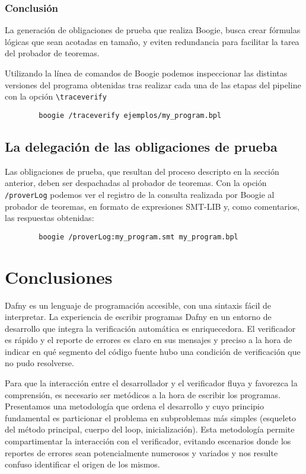 \documentclass[12pt, a4paper, openany, fleqn]{book}
\begin{document}
    \subsection*{Conclusión}

    La generación de obligaciones de prueba que realiza Boogie, busca crear fórmulas lógicas que sean acotadas en tamaño, y eviten redundancia para facilitar la tarea del probador de teoremas.
  
    Utilizando la línea de comandos de Boogie podemos inspeccionar las distintas versiones del programa obtenidas tras realizar cada una de las etapas del pipeline con la opción \verb|\traceverify|
    \begin{verbatim}
        boogie /traceverify ejemplos/my_program.bpl
    \end{verbatim}

    \section{La delegación de las obligaciones de prueba}
    Las obligaciones de prueba, que resultan del proceso descripto en la sección anterior, deben ser despachadas al probador de teoremas.
    Con la opción \verb|/proverLog| podemos ver el registro de la consulta realizada por Boogie al probador de teoremas, en formato de expresiones SMT-LIB y, como comentarios, las respuestas obtenidas:
    \begin{verbatim}
        boogie /proverLog:my_program.smt my_program.bpl
    \end{verbatim}

    \chapter{Conclusiones}
    Dafny es un lenguaje de programación accesible, con una sintaxis fácil de interpretar. La experiencia de escribir programas Dafny en un entorno de desarrollo que integra la verificación automática es enriquecedora. El verificador es rápido y el reporte de errores es claro en sus mensajes y preciso a la hora de indicar en qué segmento del código fuente hubo una condición de verificación que no pudo resolverse.

    Para que la interacción entre el desarrollador y el verificador fluya y favorezca la comprensión, es necesario ser metódicos a la hora de escribir los programas. Presentamos una metodología que ordena el desarrollo y cuyo principio fundamental es particionar el problema en subproblemas más simples (esqueleto del método principal, cuerpo del loop, inicialización). Esta metodología permite compartimentar la interacción con el verificador, evitando escenarios donde los reportes de errores sean potencialmente numerosos y variados y nos resulte confuso identificar el origen de los mismos.
\end{document}
